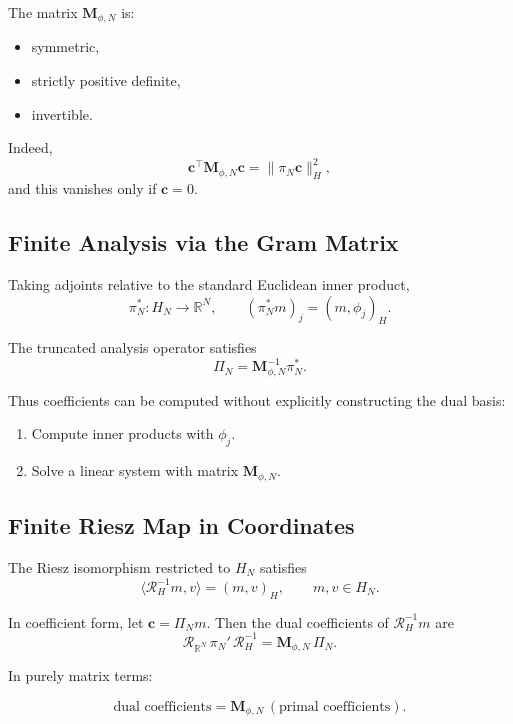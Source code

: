 \documentclass[11pt,twoside,openright]{book}
\theoremstyle{plain}
\theoremstyle{definition}
\theoremstyle{remark}
\newcommand{\Riesz}{\mathcal{R}}
\begin{document}
The matrix $\mathbf{M}_{\phi,N}$ is:

\begin{itemize}
\item symmetric,
\item strictly positive definite,
\item invertible.
\end{itemize}

Indeed,
\[
\mathbf{c}^\top \mathbf{M}_{\phi,N} \mathbf{c}
=
\|\pi_N \mathbf{c}\|_H^2,
\]
and this vanishes only if $\mathbf{c}=0$.

\subsection{Finite Analysis via the Gram Matrix}

Taking adjoints relative to the standard Euclidean inner product,
\[
\pi_N^* : H_N \to \mathbb{R}^N,
\qquad
(\pi_N^* m)_j = (m,\phi_j)_H.
\]

The truncated analysis operator satisfies
\begin{equation}
\boxed{
\Pi_N = \mathbf{M}_{\phi,N}^{-1} \pi_N^*.
}
\end{equation}

Thus coefficients can be computed without explicitly constructing
the dual basis:
\begin{enumerate}
\item Compute inner products with $\phi_j$.
\item Solve a linear system with matrix $\mathbf{M}_{\phi,N}$.
\end{enumerate}

\subsection{Finite Riesz Map in Coordinates}

The Riesz isomorphism restricted to $H_N$ satisfies
\[
\langle \Riesz_H^{-1} m , v \rangle
=
(m,v)_H,
\qquad
m,v \in H_N.
\]

In coefficient form, let $\mathbf{c}=\Pi_N m$.
Then the dual coefficients of $\Riesz_H^{-1} m$ are
\begin{equation}
\boxed{
\Riesz_{\mathbb{R}^N}\,\pi_N'\,\Riesz_H^{-1}
=
\mathbf{M}_{\phi,N}\,\Pi_N.
}
\end{equation}

In purely matrix terms:

\begin{equation}
\text{dual coefficients}
=
\mathbf{M}_{\phi,N}\,(\text{primal coefficients}).
\end{equation}
\end{document}
